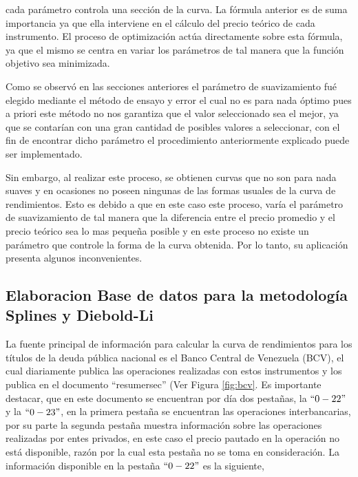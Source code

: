 \documentclass[
  12pt,
]{krantz}
\begin{document}
cada parámetro controla una sección de la curva. La fórmula anterior es de suma importancia ya que ella interviene en el cálculo del precio teórico de cada instrumento. El proceso de optimización actúa directamente sobre esta fórmula, ya que el mismo se centra en variar los parámetros de tal manera que la función objetivo sea minimizada.

Como se observó en las secciones anteriores el parámetro de suavizamiento fué elegido mediante el método de ensayo y error el cual no es para nada óptimo pues a priori este método no nos garantiza que el valor seleccionado sea el mejor, ya que se contarían con una gran cantidad de posibles valores a seleccionar, con el fin de encontrar dicho parámetro el procedimiento anteriormente explicado puede ser implementado.

Sin embargo, al realizar este proceso, se obtienen curvas que no son para nada suaves y en ocasiones no poseen ningunas de las formas usuales de la curva de rendimientos. Esto es debido a que en este caso este proceso, varía el parámetro de suavizamiento de tal manera que la diferencia entre el precio promedio y el precio teórico sea lo mas pequeña posible y en este proceso no existe un parámetro que controle la forma de la curva obtenida. Por lo tanto, su aplicación presenta algunos inconvenientes.

\hypertarget{elaboracion-base-de-datos-para-la-metodologia-splines-y-diebold-li}{%
\subsection{Elaboracion Base de datos para la metodología Splines y Diebold-Li}\label{elaboracion-base-de-datos-para-la-metodologia-splines-y-diebold-li}}

La fuente principal de información para calcular la curva de rendimientos para los títulos de la deuda pública nacional es el Banco Central de Venezuela (BCV), el cual diariamente publica las operaciones realizadas con estos instrumentos y los publica en el documento ``resumersec'' (Ver Figura \ref{fig:bcv}. Es importante destacar, que en este documento se encuentran por día dos pestañas, la \(``0-22"\) y la \(``0-23"\), en la primera pestaña se encuentran las operaciones interbancarias, por su parte la segunda pestaña muestra información sobre las operaciones realizadas por entes privados, en este caso el precio pautado en la operación no está disponible, razón por la cual esta pestaña no se toma en consideración. La información disponible en la pestaña \(``0-22"\) es la siguiente,
\end{document}
